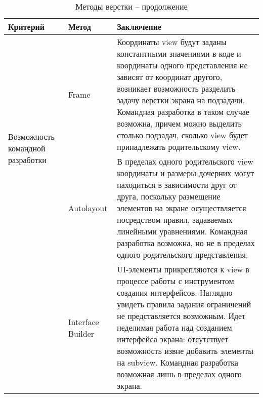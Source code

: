 \begin{table}[H]
	\centering
	\caption{Методы верстки -- продолжение}
	\label{mko_table_0}
	\begin{tabular}{|p{2.9cm}|p{2.9cm}|p{9.5cm}|}
		\hline
		\textbf{Критерий} & \textbf{Метод} & \textbf{Заключение} \\
		\hline
		\multirow{2}{2.9cm}{Возможность командной разработки} & Frame & 
		Координаты view будут заданы константными значениями в коде и координаты одного представления не зависят от координат другого, 
		возникает возможность разделить задачу верстки экрана на подзадачи. 
		Командная разработка в таком случае возможна, причем можно выделить столько подзадач, сколько view будет принадлежать родительскому view. \\
		\cline{2-3} & Autolayout & 
		В пределах одного родительского view координаты и размеры дочерних могут находиться в зависимости друг от друга, поскольку размещение элементов на экране 
		осуществляется посредством правил, задаваемых линейными уравнениями. 
		Командная разработка возможна, но не в пределах одного родительского представления.\\
		\cline{2-3} & Interface Builder & 
		UI-элементы прикрепляются к view в процессе работы с инструментом создания интерфейсов. Наглядно увидеть правила задания ограничений не представляется возможным. 
		Идет неделимая работа над созданием интерфейса экрана: отсутствует возможность извне добавить элементы на subview. 
		Командная разработка возможная лишь в пределах одного экрана. \\
		\hline
	\end{tabular}
\end{table}

